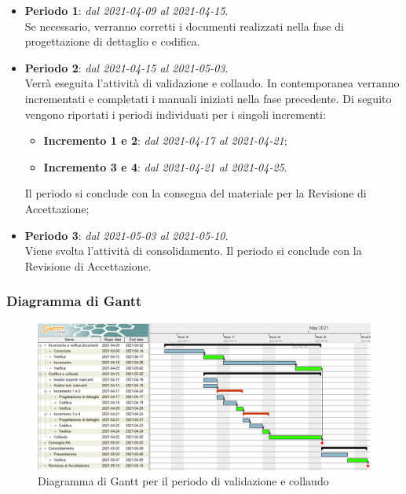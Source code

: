 \begin{itemize}
\item \textbf{Periodo 1}: \textit{dal 2021-04-09 al 2021-04-15}. \\
Se necessario, verranno corretti i documenti realizzati nella fase di progettazione di dettaglio e codifica.
\item \textbf{Periodo 2}: \textit{dal 2021-04-15 al 2021-05-03}. \\
Verrà eseguita l'attività di validazione e collaudo. In contemporanea verranno incrementati e completati i manuali iniziati nella fase precedente. Di seguito vengono riportati i periodi individuati per i singoli incrementi:
\begin{itemize}
\item \textbf{Incremento 1 e 2}: \textit{dal 2021-04-17 al 2021-04-21};
\item \textbf{Incremento 3 e 4}: \textit{dal 2021-04-21 al 2021-04-25}.
\end{itemize}
Il periodo si conclude con la consegna del materiale per la Revisione di Accettazione;
\item \textbf{Periodo 3}: \textit{dal 2021-05-03 al 2021-05-10}. \\
Viene svolta l'attività di consolidamento. Il periodo si conclude con la Revisione di Accettazione.
\end{itemize}

\subsubsection{Diagramma di Gantt}

\begin{figure}[H]
\centering

\centerline{\includegraphics[scale=0.6]{res/Pianificazione/Gantt/verifica}}
\caption{Diagramma di Gantt per il periodo di validazione e collaudo}
\end{figure}